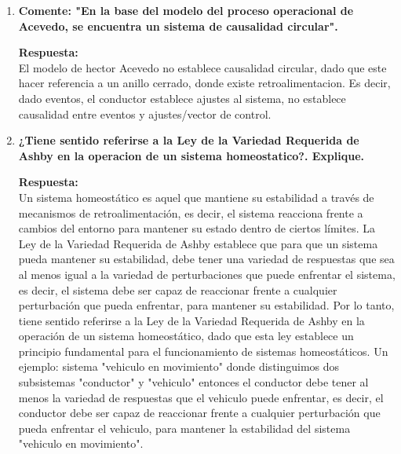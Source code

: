 \documentclass[12pt,a4paper]{article}
\begin{document}
\begin{enumerate}[label=\textbf{Pregunta \arabic*.}]
    \item \textbf{Comente: "En la base del modelo del proceso operacional de Acevedo, se encuentra un sistema de causalidad circular".}

          \textbf{Respuesta:} \\
          El modelo de hector Acevedo no establece causalidad circular, dado que este hacer referencia a un anillo cerrado, donde existe retroalimentacion.
          Es decir, dado eventos, el conductor establece ajustes al sistema, no establece causalidad entre eventos y ajustes/vector de control.

    \item \textbf{¿Tiene sentido referirse a la Ley de la Variedad Requerida de Ashby en la operacion de un sistema homeostatico?. Explique.}

          \textbf{Respuesta:} \\
          Un sistema homeostático es aquel que mantiene su estabilidad a través de mecanismos de retroalimentación, es decir, el sistema reacciona frente a cambios del entorno para mantener su estado dentro de ciertos límites.
          La Ley de la Variedad Requerida de Ashby establece que para que un sistema pueda mantener su estabilidad, debe tener una variedad de respuestas que sea al menos igual a la variedad de perturbaciones que puede enfrentar el sistema, es decir, el sistema debe ser capaz de reaccionar frente a cualquier perturbación que pueda enfrentar, para mantener su estabilidad.
          Por lo tanto, tiene sentido referirse a la Ley de la Variedad Requerida de Ashby en la operación de un sistema homeostático, dado que esta ley establece un principio fundamental para el funcionamiento de sistemas homeostáticos.
          Un ejemplo: sistema "vehiculo en movimiento" donde distinguimos dos subsistemas "conductor" y "vehiculo" entonces el conductor debe tener al menos la variedad de respuestas que el vehiculo puede enfrentar, es decir, el conductor debe ser capaz de reaccionar frente a cualquier perturbación que pueda enfrentar el vehiculo, para mantener la estabilidad del sistema "vehiculo en movimiento".


\end{enumerate}
\end{document}
